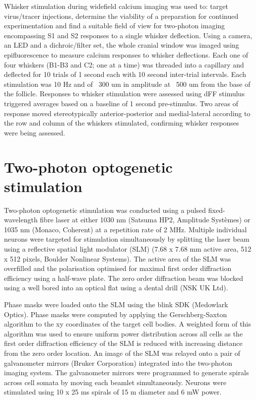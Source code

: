 Whisker stimulation during widefield calcium imaging was used to: target virus/tracer injections, determine the viability of a preparation for continued experimentation and find a suitable field of view for two-photon imaging encompassing S1 and S2 responses to a single whisker deflection. Using a camera, an LED and a dichroic/filter set, the whole cranial window was imaged using epifluorescence to measure calcium responses to whisker deflections. Each one of four whiskers (B1-B3 and C2; one at a time) was threaded into a capillary and deflected for 10 trials of 1 second each with 10 second inter-trial intervals. Each stimulation was 10 Hz and of ~300 um in amplitude at ~500 um from the base of the follicle. Responses to whisker stimulation were assessed using dFF stimulus triggered averages based on a baseline of 1 second pre-stimulus. Two areas of response moved stereotypically anterior-posterior and medial-lateral according to the row and column of the whiskers stimulated, confirming whisker responses were being assessed.

\section{Two-photon optogenetic stimulation}

Two-photon optogenetic stimulation was conducted using a pulsed fixed-wavelength fibre laser at either 1030 nm (Satsuma HP2, Amplitude Systèmes) or 1035 nm (Monaco, Coherent) at a repetition rate of 2 MHz. Multiple individual neurons were targeted for stimulation simultaneously by splitting the laser beam using a reflective spatial light modulator (SLM) (7.68 x 7.68 mm active area, 512 x 512 pixels, Boulder Nonlinear Systems). The active area of the SLM was overfilled and the polarisation optimised for maximal first order diffraction efficiency using a half-wave plate. The zero order diffraction beam was blocked using a well bored into an optical flat using a dental drill (NSK UK Ltd).

Phase masks were loaded onto the SLM using the blink SDK (Medowlark Optics). Phase masks were computed by applying the Gerschberg-Saxton algorithm \cite{gerchberg_practical_1972} to the xy coordinates of the target cell bodies. A weighted form of this algorithm was used to ensure uniform power distribution across all cells as the first order diffraction efficiency of the SLM is reduced with increasing distance from the zero order location. An image of the SLM was relayed onto a pair of galvanometer mirrors (Bruker Corporation) integrated into the two-photon imaging system. The galvanometer mirrors were programmed to generate spirals across cell somata by moving each beamlet simultaneously. Neurons were stimulated using 10 x 25 ms spirals of 15 \textmu m diameter and 6 mW power.

